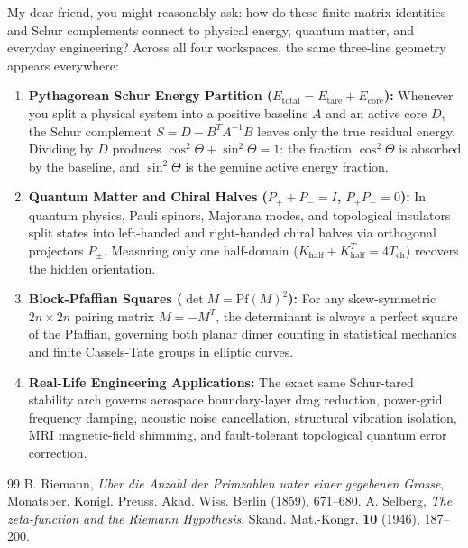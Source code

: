 \documentclass[11pt,a4paper]{article}
\theoremstyle{definition}
\begin{document}
My dear friend, you might reasonably ask: how do these finite matrix identities and Schur complements connect to physical energy, quantum matter, and everyday engineering? Across all four workspaces, the same three-line geometry appears everywhere:

\begin{enumerate}
  \item \textbf{Pythagorean Schur Energy Partition ($E_{\mathrm{total}} = E_{\mathrm{tare}} + E_{\mathrm{core}}$):} Whenever you split a physical system into a positive baseline $A$ and an active core $D$, the Schur complement $S = D - B^T A^{-1} B$ leaves only the true residual energy. Dividing by $D$ produces $\cos^2\Theta + \sin^2\Theta = 1$: the fraction $\cos^2\Theta$ is absorbed by the baseline, and $\sin^2\Theta$ is the genuine active energy fraction.
  \item \textbf{Quantum Matter and Chiral Halves ($P_+ + P_- = I$, $P_+ P_- = 0$):} In quantum physics, Pauli spinors, Majorana modes, and topological insulators split states into left-handed and right-handed chiral halves via orthogonal projectors $P_\pm$. Measuring only one half-domain ($K_{\mathrm{half}} + K_{\mathrm{half}}^T = 4 T_{\mathrm{ch}}$) recovers the hidden orientation.
  \item \textbf{Block-Pfaffian Squares ($\det M = \mathrm{Pf}(M)^2$):} For any skew-symmetric $2n \times 2n$ pairing matrix $M = -M^T$, the determinant is always a perfect square of the Pfaffian, governing both planar dimer counting in statistical mechanics and finite Cassels-Tate groups in elliptic curves.
  \item \textbf{Real-Life Engineering Applications:} The exact same Schur-tared stability arch governs aerospace boundary-layer drag reduction, power-grid frequency damping, acoustic noise cancellation, structural vibration isolation, MRI magnetic-field shimming, and fault-tolerant topological quantum error correction.
\end{enumerate}

\begin{thebibliography}{99}
 B. Riemann, \emph{Uber die Anzahl der Primzahlen unter einer gegebenen Grosse}, Monatsber. Konigl. Preuss. Akad. Wiss. Berlin (1859), 671--680.
 A. Selberg, \emph{The zeta-function and the Riemann Hypothesis}, Skand. Mat.-Kongr. \textbf{10} (1946), 187--200.
\end{thebibliography}
\end{document}
